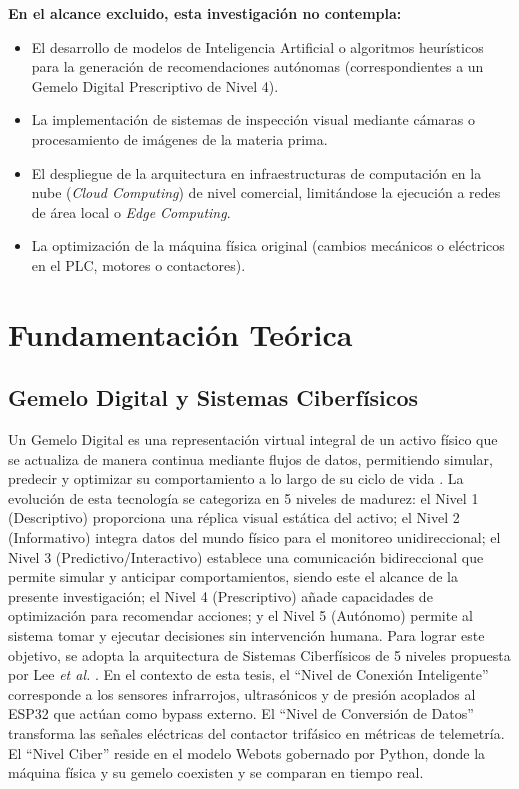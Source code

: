 \textbf{En el alcance excluido, esta investigación no contempla:}
\begin{itemize}
  \item El desarrollo de modelos de Inteligencia Artificial o algoritmos heurísticos para la generación de recomendaciones autónomas (correspondientes a un Gemelo Digital Prescriptivo de Nivel 4).
  \item La implementación de sistemas de inspección visual mediante cámaras o procesamiento de imágenes de la materia prima.
  \item El despliegue de la arquitectura en infraestructuras de computación en la nube (\textit{Cloud Computing}) de nivel comercial, limitándose la ejecución a redes de área local o \textit{Edge Computing}.
  \item La optimización de la máquina física original (cambios mecánicos o eléctricos en el PLC, motores o contactores).
\end{itemize}

\section{Fundamentación Teórica}

\subsection*{Gemelo Digital y Sistemas Ciberfísicos}
Un Gemelo Digital es una representación virtual integral de un activo físico que se actualiza de manera continua mediante flujos de datos, permitiendo simular, predecir y optimizar su comportamiento a lo largo de su ciclo de vida \cite{tao2019}. La evolución de esta tecnología se categoriza en 5 niveles de madurez: el Nivel 1 (Descriptivo) proporciona una réplica visual estática del activo; el Nivel 2 (Informativo) integra datos del mundo físico para el monitoreo unidireccional; el Nivel 3 (Predictivo/Interactivo) establece una comunicación bidireccional que permite simular y anticipar comportamientos, siendo este el alcance de la presente investigación; el Nivel 4 (Prescriptivo) añade capacidades de optimización para recomendar acciones; y el Nivel 5 (Autónomo) permite al sistema tomar y ejecutar decisiones sin intervención humana. Para lograr este objetivo, se adopta la arquitectura de Sistemas Ciberfísicos de 5 niveles propuesta por Lee \textit{et al.} \cite{lee2015}. En el contexto de esta tesis, el ``Nivel de Conexión Inteligente'' corresponde a los sensores infrarrojos, ultrasónicos y de presión acoplados al ESP32 que actúan como bypass externo. El ``Nivel de Conversión de Datos'' transforma las señales eléctricas del contactor trifásico en métricas de telemetría. El ``Nivel Ciber'' reside en el modelo Webots gobernado por Python, donde la máquina física y su gemelo coexisten y se comparan en tiempo real.

